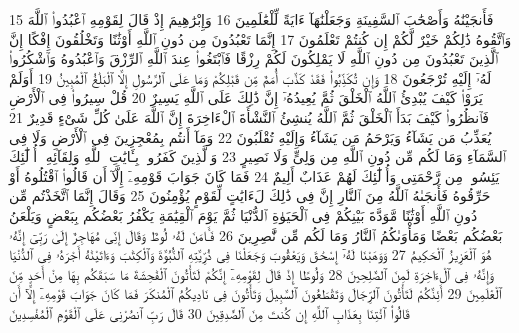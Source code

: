 {\tiny\colorbox{cl_aya}{15}} فَأَنجَيْنَٰهُ وَأَصْحَٰبَ ٱلسَّفِينَةِ وَجَعَلْنَٰهَآ ءَايَةً لِّلْعَٰلَمِينَ
{\tiny\colorbox{cl_aya}{16}} وَإِبْرَٰهِيمَ إِذْ قَالَ لِقَوْمِهِ ٱعْبُدُوا۟ ٱللَّهَ وَٱتَّقُوهُ ذَٰلِكُمْ خَيْرٌ لَّكُمْ إِن كُنتُمْ تَعْلَمُونَ
{\tiny\colorbox{cl_aya}{17}} إِنَّمَا تَعْبُدُونَ مِن دُونِ ٱللَّهِ أَوْثَٰنًا وَتَخْلُقُونَ إِفْكًا إِنَّ ٱلَّذِينَ تَعْبُدُونَ مِن دُونِ ٱللَّهِ لَا يَمْلِكُونَ لَكُمْ رِزْقًا فَٱبْتَغُوا۟ عِندَ ٱللَّهِ ٱلرِّزْقَ وَٱعْبُدُوهُ وَٱشْكُرُوا۟ لَهُۥٓ إِلَيْهِ تُرْجَعُونَ
{\tiny\colorbox{cl_aya}{18}} وَإِن تُكَذِّبُوا۟ فَقَدْ كَذَّبَ أُمَمٌ مِّن قَبْلِكُمْ وَمَا عَلَى ٱلرَّسُولِ إِلَّا ٱلْبَلَٰغُ ٱلْمُبِينُ
{\tiny\colorbox{cl_aya}{19}} أَوَلَمْ يَرَوْا۟ كَيْفَ يُبْدِئُ ٱللَّهُ ٱلْخَلْقَ ثُمَّ يُعِيدُهُۥٓ إِنَّ ذَٰلِكَ عَلَى ٱللَّهِ يَسِيرٌ
{\tiny\colorbox{cl_aya}{20}} قُلْ سِيرُوا۟ فِى ٱلْأَرْضِ فَٱنظُرُوا۟ كَيْفَ بَدَأَ ٱلْخَلْقَ ثُمَّ ٱللَّهُ يُنشِئُ ٱلنَّشْأَةَ ٱلْءَاخِرَةَ إِنَّ ٱللَّهَ عَلَىٰ كُلِّ شَىْءٍ قَدِيرٌ
{\tiny\colorbox{cl_aya}{21}} يُعَذِّبُ مَن يَشَآءُ وَيَرْحَمُ مَن يَشَآءُ وَإِلَيْهِ تُقْلَبُونَ
{\tiny\colorbox{cl_aya}{22}} وَمَآ أَنتُم بِمُعْجِزِينَ فِى ٱلْأَرْضِ وَلَا فِى ٱلسَّمَآءِ وَمَا لَكُم مِّن دُونِ ٱللَّهِ مِن وَلِىٍّ وَلَا نَصِيرٍ
{\tiny\colorbox{cl_aya}{23}} وَٱلَّذِينَ كَفَرُوا۟ بِـَٔايَٰتِ ٱللَّهِ وَلِقَآئِهِۦٓ أُو۟لَٰٓئِكَ يَئِسُوا۟ مِن رَّحْمَتِى وَأُو۟لَٰٓئِكَ لَهُمْ عَذَابٌ أَلِيمٌ
{\tiny\colorbox{cl_aya}{24}} فَمَا كَانَ جَوَابَ قَوْمِهِۦٓ إِلَّآ أَن قَالُوا۟ ٱقْتُلُوهُ أَوْ حَرِّقُوهُ فَأَنجَىٰهُ ٱللَّهُ مِنَ ٱلنَّارِ إِنَّ فِى ذَٰلِكَ لَءَايَٰتٍ لِّقَوْمٍ يُؤْمِنُونَ
{\tiny\colorbox{cl_aya}{25}} وَقَالَ إِنَّمَا ٱتَّخَذْتُم مِّن دُونِ ٱللَّهِ أَوْثَٰنًا مَّوَدَّةَ بَيْنِكُمْ فِى ٱلْحَيَوٰةِ ٱلدُّنْيَا ثُمَّ يَوْمَ ٱلْقِيَٰمَةِ يَكْفُرُ بَعْضُكُم بِبَعْضٍ وَيَلْعَنُ بَعْضُكُم بَعْضًا وَمَأْوَىٰكُمُ ٱلنَّارُ وَمَا لَكُم مِّن نَّٰصِرِينَ
{\tiny\colorbox{cl_aya}{26}} فَـَٔامَنَ لَهُۥ لُوطٌ وَقَالَ إِنِّى مُهَاجِرٌ إِلَىٰ رَبِّىٓ إِنَّهُۥ هُوَ ٱلْعَزِيزُ ٱلْحَكِيمُ
{\tiny\colorbox{cl_aya}{27}} وَوَهَبْنَا لَهُۥٓ إِسْحَٰقَ وَيَعْقُوبَ وَجَعَلْنَا فِى ذُرِّيَّتِهِ ٱلنُّبُوَّةَ وَٱلْكِتَٰبَ وَءَاتَيْنَٰهُ أَجْرَهُۥ فِى ٱلدُّنْيَا وَإِنَّهُۥ فِى ٱلْءَاخِرَةِ لَمِنَ ٱلصَّٰلِحِينَ
{\tiny\colorbox{cl_aya}{28}} وَلُوطًا إِذْ قَالَ لِقَوْمِهِۦٓ إِنَّكُمْ لَتَأْتُونَ ٱلْفَٰحِشَةَ مَا سَبَقَكُم بِهَا مِنْ أَحَدٍ مِّنَ ٱلْعَٰلَمِينَ
{\tiny\colorbox{cl_aya}{29}} أَئِنَّكُمْ لَتَأْتُونَ ٱلرِّجَالَ وَتَقْطَعُونَ ٱلسَّبِيلَ وَتَأْتُونَ فِى نَادِيكُمُ ٱلْمُنكَرَ فَمَا كَانَ جَوَابَ قَوْمِهِۦٓ إِلَّآ أَن قَالُوا۟ ٱئْتِنَا بِعَذَابِ ٱللَّهِ إِن كُنتَ مِنَ ٱلصَّٰدِقِينَ
{\tiny\colorbox{cl_aya}{30}} قَالَ رَبِّ ٱنصُرْنِى عَلَى ٱلْقَوْمِ ٱلْمُفْسِدِينَ
